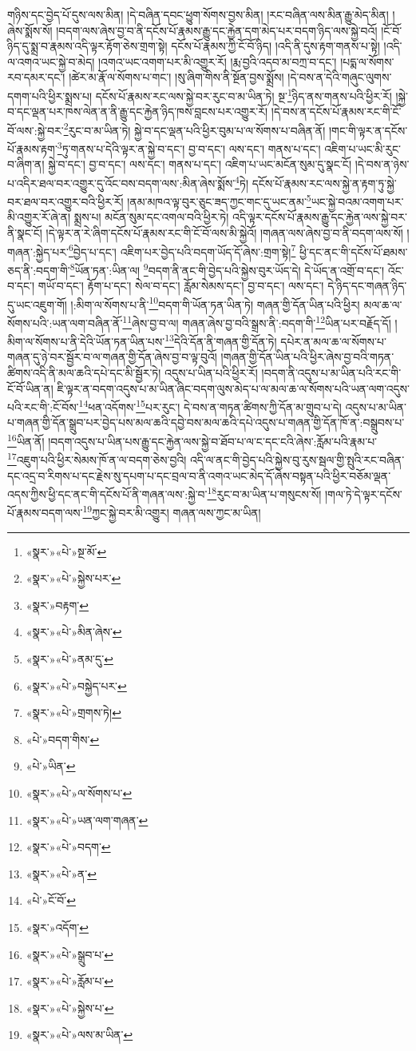 གཉིས་དང་བྱེད་པོ་དུས་ལས་མིན། །དེ་བཞིན་དབང་ཕྱུག་སོགས་བྱས་མིན། །རང་བཞིན་ལས་མིན་རྒྱུ་མེད་མིན། །ཞེས་སྨོས་སོ། །བདག་ལས་ཞེས་བྱ་བ་ནི་དངོས་པོ་རྣམས་རྒྱུ་དང་རྐྱེན་དག་མེད་པར་བདག་ཉིད་ལས་སྐྱེ་བའོ། །ངོ་བོ་ཉིད་དུ་སྨྲ་བ་རྣམས་འདི་ལྟར་རྟོག་ཅེས་གྲག་སྟེ། དངོས་པོ་རྣམས་ཀྱི་ངོ་བོ་ཉིད། །འདི་ནི་དུས་རྟག་གནས་པ་སྟེ། །འདི་ལ་འགའ་ཡང་སྐྱེ་བ་མེད། །འགའ་ཡང་འགག་པར་མི་འགྱུར་རོ། །རྨ་བྱའི་འདབ་མ་བཀྲ་བ་དང་། །པདྨ་ལ་སོགས་རབ་དམར་དང་། །ཚེར་མ་རྣོ་ལ་སོགས་པ་གང་། །སུ་ཞིག་གིས་ནི་སྔོན་བྱས་སྨྲོས། །དེ་བས་ན་དེའི་གཞུང་ལུགས་དགག་པའི་ཕྱིར་སྨྲས་པ། དངོས་པོ་རྣམས་རང་ལས་སྐྱེ་བར་རུང་བ་མ་ཡིན་ཏེ། སྔ་\footnote{«སྣར་»«པེ་»སྔ་མོ་}ཉིད་ནས་གནས་པའི་ཕྱིར་རོ། །སྐྱེ་བ་དང་ལྡན་པར་ཁས་ལེན་ན་ནི་རྒྱུ་དང་རྐྱེན་ཉིད་ཁས་བླངས་པར་འགྱུར་རོ། །དེ་བས་ན་དངོས་པོ་རྣམས་རང་གི་ངོ་བོ་ལས་:སྐྱེ་བར་\footnote{«སྣར་»«པེ་»སྐྱེས་པར་}རུང་བ་མ་ཡིན་ཏེ། སྐྱེ་བ་དང་ལྡན་པའི་ཕྱིར་བུམ་པ་ལ་སོགས་པ་བཞིན་ནོ། །གང་གི་ལྟར་ན་དངོས་པོ་རྣམས་རྟག་\footnote{«སྣར་»བརྟག་}ཏུ་གནས་པ་དེའི་ལྟར་ན་སྐྱེ་བ་དང་། བྱ་བ་དང་། ལས་དང་། གནས་པ་དང་། འཇིག་པ་ཡང་མི་རུང་བ་ཞིག་ན། སྐྱེ་བ་དང་། བྱ་བ་དང་། ལས་དང་། གནས་པ་དང་། འཇིག་པ་ཡང་མངོན་སུམ་དུ་སྣང་ངོ། །དེ་བས་ན་ཉེས་པ་འདིར་ཐལ་བར་འགྱུར་དུ་འོང་བས་བདག་ལས་:མིན་ཞེས་སྨོས་\footnote{«སྣར་»«པེ་»མིན་ཞེས་}ཏེ། དངོས་པོ་རྣམས་རང་ལས་སྐྱེ་ན་རྟག་ཏུ་སྐྱེ་བར་ཐལ་བར་འགྱུར་བའི་ཕྱིར་རོ། །ནམ་མཁའ་ལྟ་བུར་ཅུང་ཟད་ཀྱང་གང་དུ་ཡང་ནམ་\footnote{«སྣར་»«པེ་»ནམ་དུ་}ཡང་སྐྱེ་བའམ་འགག་པར་མི་འགྱུར་རོ་ཞེ་ན། སྨྲས་པ། མངོན་སུམ་དང་འགལ་བའི་ཕྱིར་ཏེ། འདི་ལྟར་དངོས་པོ་རྣམས་རྒྱུ་དང་རྐྱེན་ལས་སྐྱེ་བར་ནི་སྣང་ངོ། །དེ་ལྟར་ན་རེ་ཞིག་དངོས་པོ་རྣམས་རང་གི་ངོ་བོ་ལས་མི་སྐྱེའོ། །གཞན་ལས་ཞེས་བྱ་བ་ནི་བདག་ལས་སོ། །གཞན་:སྐྱེད་པར་\footnote{«སྣར་»«པེ་»བསྐྱེད་པར་}བྱེད་པ་དང་། འཇིག་པར་བྱེད་པའི་བདག་ཡོད་དོ་ཞེས་:གྲག་སྟེ།\footnote{«སྣར་»«པེ་»གྲགས་ཏེ།} ཕྱི་དང་ནང་གི་དངོས་པོ་ཐམས་ཅད་ནི་:བདག་གི་\footnote{«པེ་»བདག་གིས་}ཡོན་ཏན་:ཡིན་ལ། \footnote{«པེ་»ཡིན་}བདག་ནི་ནང་གི་བྱེད་པའི་སྐྱེས་བུར་ཡོད་དེ། དེ་ཡོད་ན་འགྲོ་བ་དང་། འོང་བ་དང་། གཡོ་བ་དང་། རྟོག་པ་དང་། སེལ་བ་དང་། རློམ་སེམས་དང་། བྱ་བ་དང་། ལས་དང་། དེ་ཉིད་དང་གཞན་ཉིད་དུ་ཡང་འཇུག་གོ། །:མིག་ལ་སོགས་པ་ནི་\footnote{«སྣར་»«པེ་»ལ་སོགས་པ་}བདག་གི་ཡོན་ཏན་ཡིན་ཏེ། གཞན་གྱི་དོན་ཡིན་པའི་ཕྱིར། མལ་ཆ་ལ་སོགས་པའི་:ཡན་ལག་བཞིན་ནོ་\footnote{«སྣར་»«པེ་»ཡན་ལག་གཞན་}ཞེས་བྱ་བ་ལ། གཞན་ཞེས་བྱ་བའི་སྒྲས་ནི་:བདག་གི་\footnote{«སྣར་»«པེ་»བདག་}ཡིན་པར་བརྗོད་དོ། །མིག་ལ་སོགས་པ་ནི་དེའི་ཡོན་ཏན་ཡིན་པས་\footnote{«སྣར་»«པེ་»ན་}དེའི་དོན་ནི་གཞན་གྱི་དོན་ཏེ། དཔེར་ན་མལ་ཆ་ལ་སོགས་པ་གཞན་དུ་ཉེ་བར་སྦྱོར་བ་ལ་གཞན་གྱི་དོན་ཞེས་བྱ་བ་ལྟ་བུའོ། །གཞན་གྱི་དོན་ཡིན་པའི་ཕྱིར་ཞེས་བྱ་བའི་གཏན་ཚིགས་འདི་ནི་མལ་ཆའི་དཔེ་དང་མི་སྦྱོར་ཏེ། འདུས་པ་ཡིན་པའི་ཕྱིར་རོ། །བདག་ནི་འདུས་པ་མ་ཡིན་པའི་རང་གི་ངོ་བོ་ཡིན་ན། ཇི་ལྟར་ན་བདག་འདུས་པ་མ་ཡིན་ཞིང་བདག་ལུས་མེད་པ་ལ་མལ་ཆ་ལ་སོགས་པའི་ཡན་ལག་འདུས་པའི་རང་གི་:ངོ་བོས་\footnote{«པེ་»ངོ་བོ་}ཕན་འདོགས་\footnote{«སྣར་»འདོག་}པར་རུང་། དེ་བས་ན་གཏན་ཚིགས་ཀྱི་དོན་མ་གྲུབ་པ་དེ། འདུས་པ་མ་ཡིན་པ་གཞན་གྱི་དོན་སྒྲུབ་པར་བྱེད་པས་མལ་ཆའི་དབྱེ་བས་མལ་ཆའི་དཔེ་འདུས་པ་གཞན་གྱི་དོན་ཁོ་ན་:བསྒྲུབས་པ་\footnote{«སྣར་»«པེ་»སྒྲུབ་པ་}ཡིན་ནོ། །བདག་འདུས་པ་ཡིན་པས་རྒྱུ་དང་རྐྱེན་ལས་སྐྱེ་བ་ཐོབ་པ་ལ་ང་དང་ངའི་ཞེས་:རློམ་པའི་རྣམ་པ་\footnote{«སྣར་»«པེ་»རློམ་པ་}འཇུག་པའི་ཕྱིར་སེམས་ཁོ་ན་ལ་བདག་ཅེས་བྱའི། འདི་ལ་ནང་གི་བྱེད་པའི་སྐྱེས་བུ་རུས་སྦལ་གྱི་སྤུའི་རང་བཞིན་དང་འདྲ་བ་རིགས་པ་དང་རྗེས་སུ་དཔག་པ་དང་བྲལ་བ་ནི་འགའ་ཡང་མེད་དོ་ཞེས་བསྟན་པའི་ཕྱིར་བཅོམ་ལྡན་འདས་ཀྱིས་ཕྱི་དང་ནང་གི་དངོས་པོ་ནི་གཞན་ལས་:སྐྱེ་བ་\footnote{«སྣར་»«པེ་»སྐྱེས་པ་}རུང་བ་མ་ཡིན་པ་གསུངས་སོ། །གལ་ཏེ་དེ་ལྟར་དངོས་པོ་རྣམས་བདག་ལས་\footnote{«སྣར་»«པེ་»ལས་མ་ཡིན་}ཀྱང་སྐྱེ་བར་མི་འགྱུར། གཞན་ལས་ཀྱང་མ་ཡིན། 
